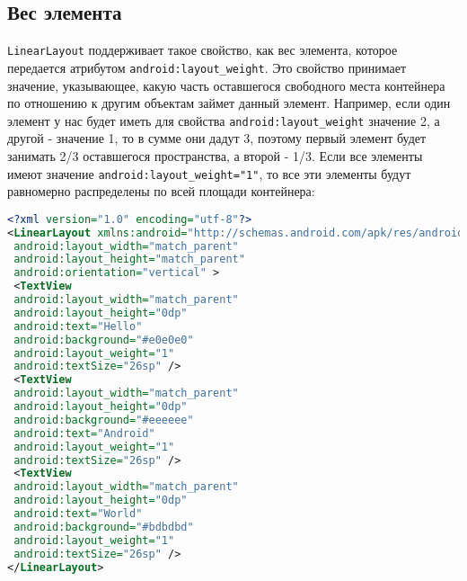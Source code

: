 
\subsection{Вес элемента}
\texttt{LinearLayout} поддерживает такое свойство, как вес элемента, которое
передается атрибутом \texttt{android:layout\_weight}.
Это свойство принимает
значение, указывающее, какую часть оставшегося свободного места
контейнера по отношению к другим объектам займет данный элемент.
Например, если один элемент у нас будет иметь для свойства
\texttt{android:layout\_weight} значение 2, а другой - значение 1, то в сумме они дадут
3, поэтому первый элемент будет занимать 2/3 оставшегося пространства, а
второй - 1/3.
Если все элементы имеют значение \texttt{android:layout\_weight="1"}, то все эти
элементы будут равномерно распределены по всей площади контейнера:

\begin{lstlisting}[language=xml, caption=\leftline{xml}, label=lst:Вес элемента]
<?xml version="1.0" encoding="utf-8"?>
<LinearLayout xmlns:android="http://schemas.android.com/apk/res/android"
 android:layout_width="match_parent"
 android:layout_height="match_parent"
 android:orientation="vertical" >
 <TextView
 android:layout_width="match_parent"
 android:layout_height="0dp"
 android:text="Hello"
 android:background="#e0e0e0"
 android:layout_weight="1"
 android:textSize="26sp" />
 <TextView
 android:layout_width="match_parent"
 android:layout_height="0dp"
 android:background="#eeeeee"
 android:text="Android"
 android:layout_weight="1"
 android:textSize="26sp" />
 <TextView
 android:layout_width="match_parent"
 android:layout_height="0dp"
 android:text="World"
 android:background="#bdbdbd"
 android:layout_weight="1"
 android:textSize="26sp" />
</LinearLayout>
\end{lstlisting}


